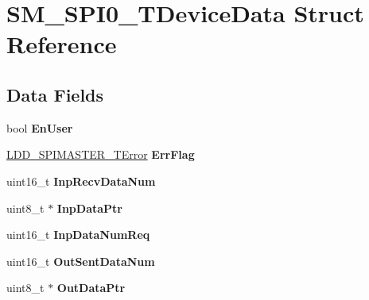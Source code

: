 \hypertarget{struct_s_m___s_p_i0___t_device_data}{\section{S\-M\-\_\-\-S\-P\-I0\-\_\-\-T\-Device\-Data Struct Reference}
\label{struct_s_m___s_p_i0___t_device_data}
}
\subsection*{Data Fields}
\begin{DoxyCompactItemize}
\item 
\hypertarget{struct_s_m___s_p_i0___t_device_data_a4341328a8f89f65f770165f2f02897be}{bool {\bfseries En\-User}}\label{struct_s_m___s_p_i0___t_device_data_a4341328a8f89f65f770165f2f02897be}

\item 
\hypertarget{struct_s_m___s_p_i0___t_device_data_a7fdc18519aa8d07f354875a95a5ad2f8}{\hyperlink{group___p_e___types__module_ga2ea1cac60780052d8927996feafc3c87}{L\-D\-D\-\_\-\-S\-P\-I\-M\-A\-S\-T\-E\-R\-\_\-\-T\-Error} {\bfseries Err\-Flag}}\label{struct_s_m___s_p_i0___t_device_data_a7fdc18519aa8d07f354875a95a5ad2f8}

\item 
\hypertarget{struct_s_m___s_p_i0___t_device_data_a210476f10eaccb6b0aeee300e8c84c8a}{uint16\-\_\-t {\bfseries Inp\-Recv\-Data\-Num}}\label{struct_s_m___s_p_i0___t_device_data_a210476f10eaccb6b0aeee300e8c84c8a}

\item 
\hypertarget{struct_s_m___s_p_i0___t_device_data_af836690a8e1608dcb511672ab1f9cee6}{uint8\-\_\-t $\ast$ {\bfseries Inp\-Data\-Ptr}}\label{struct_s_m___s_p_i0___t_device_data_af836690a8e1608dcb511672ab1f9cee6}

\item 
\hypertarget{struct_s_m___s_p_i0___t_device_data_afe37a2594999fce21ce3c089d86620b7}{uint16\-\_\-t {\bfseries Inp\-Data\-Num\-Req}}\label{struct_s_m___s_p_i0___t_device_data_afe37a2594999fce21ce3c089d86620b7}

\item 
\hypertarget{struct_s_m___s_p_i0___t_device_data_a1de64c04c511bc9b8c267426b0019812}{uint16\-\_\-t {\bfseries Out\-Sent\-Data\-Num}}\label{struct_s_m___s_p_i0___t_device_data_a1de64c04c511bc9b8c267426b0019812}

\item 
\hypertarget{struct_s_m___s_p_i0___t_device_data_aca5e3ceb2934a543047939f9a908dc29}{uint8\-\_\-t $\ast$ {\bfseries Out\-Data\-Ptr}}\label{struct_s_m___s_p_i0___t_device_data_aca5e3ceb2934a543047939f9a908dc29}


\end{DoxyCompactItemize}
